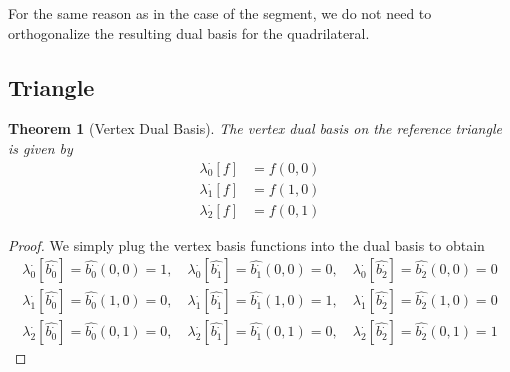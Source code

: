 \documentclass[10pt,a4paper]{article}
\newtheorem{thm}{Theorem}
\begin{document}
    For the same reason as in the case of the segment, we do not need to orthogonalize the resulting dual basis for the quadrilateral.


\subsection{Triangle}

    \begin{thm}[Vertex Dual Basis]
        The vertex dual basis on the reference triangle is given by
        \begin{align*}
            \lambda_0^{\cdot}[f] &= f(0,0) \\
            \lambda_1^{\cdot}[f] &= f(1,0) \\
            \lambda_2^{\cdot}[f] &= f(0,1)
        \end{align*}
    \end{thm}
    \begin{proof}
        We simply plug the vertex basis functions into the dual basis to obtain
        \begin{align*}
            \lambda_0^{\cdot}[\widehat{b_0^{\cdot}}] = \widehat{b_0^{\cdot}}(0,0) = 1,\quad \lambda_0^{\cdot}[\widehat{b_1^{\cdot}}] = \widehat{b_1^{\cdot}}(0,0) = 0,\quad \lambda_0^{\cdot}[\widehat{b_2^{\cdot}}] = \widehat{b_2^{\cdot}}(0,0) = 0 \\
            \lambda_1^{\cdot}[\widehat{b_0^{\cdot}}] = \widehat{b_0^{\cdot}}(1,0) = 0,\quad \lambda_1^{\cdot}[\widehat{b_1^{\cdot}}] = \widehat{b_1^{\cdot}}(1,0) = 1,\quad \lambda_1^{\cdot}[\widehat{b_2^{\cdot}}] = \widehat{b_2^{\cdot}}(1,0) = 0 \\
            \lambda_2^{\cdot}[\widehat{b_0^{\cdot}}] = \widehat{b_0^{\cdot}}(0,1) = 0,\quad \lambda_2^{\cdot}[\widehat{b_1^{\cdot}}] = \widehat{b_1^{\cdot}}(0,1) = 0,\quad \lambda_2^{\cdot}[\widehat{b_2^{\cdot}}] = \widehat{b_2^{\cdot}}(0,1) = 1
        \end{align*}
    \end{proof}
\end{document}
